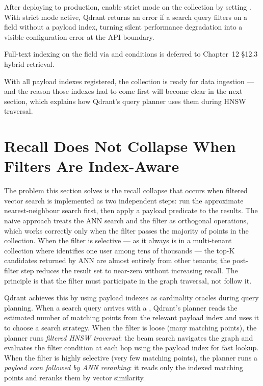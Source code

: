 \begin{tipbox}
After deploying to production, enable strict mode on the collection by
setting . With strict mode
active, Qdrant returns an error if a search query filters on a field
without a payload index, turning silent performance degradation into a
visible configuration error at the API boundary.

Full-text indexing on the  field via 
and  conditions is deferred to Chapter~12 \S12.3 hybrid
retrieval.
\end{tipbox}

With all payload indexes registered, the collection is ready for data
ingestion --- and the reason those indexes had to come first will become
clear in the next section, which explains how Qdrant's query planner uses
them during HNSW traversal.


\section{Recall Does Not Collapse When Filters Are Index-Aware}
\label{sec:filter-aware-hnsw}

The problem this section solves is the recall collapse that occurs when
filtered vector search is implemented as two independent steps: run the
approximate nearest-neighbour search first, then apply a payload predicate
to the results. The naive approach treats the ANN search and the filter
as orthogonal operations, which works correctly only when the filter
passes the majority of points in the collection. When the filter is
selective --- as it always is in a multi-tenant collection where
 identifies one user among tens of thousands --- the top-K
candidates returned by ANN are almost entirely from other tenants; the
post-filter step reduces the result set to near-zero without increasing
recall. The principle is that the filter must participate in the graph
traversal, not follow it.

Qdrant achieves this by using payload indexes as cardinality oracles during
query planning. When a search query arrives with a ,
Qdrant's planner reads the estimated number of matching points from the
relevant payload index and uses it to choose a search strategy. When the
filter is loose (many matching points), the planner runs
\emph{filtered HNSW traversal}: the beam search navigates the graph and
evaluates the filter condition at each hop using the payload index for fast
lookup. When the filter is highly selective (very few matching points), the
planner runs a \emph{payload scan followed by ANN reranking}: it reads only
the indexed matching points and reranks them by vector similarity.

